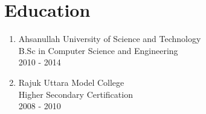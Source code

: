 \section{Education}

\begin{enumerate}
  \item
  Ahsanullah University of Science and Technology\\
  B.Sc in Computer Science and Engineering\\
  2010 - 2014
  \item
  Rajuk Uttara Model College\\
  Higher Secondary Certification\\
  2008 - 2010
\end{enumerate}
